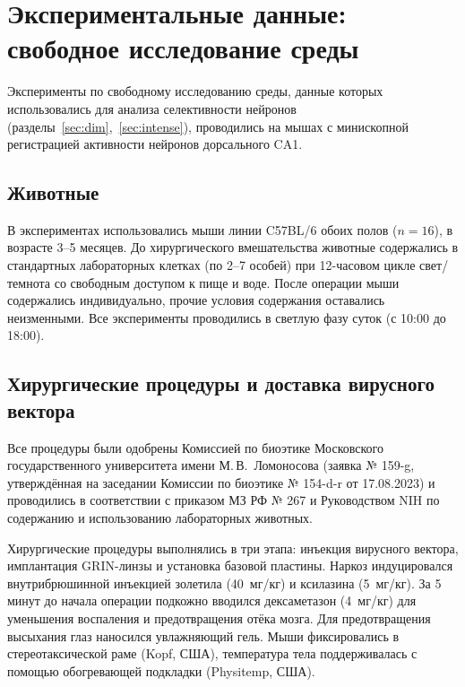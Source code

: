 
\section{Экспериментальные данные: свободное исследование среды}\label{sec:nof_data}

Эксперименты по свободному исследованию среды, данные которых использовались для анализа селективности нейронов (разделы~\ref{sec:dim},~\ref{sec:intense}), проводились на мышах с минископной регистрацией активности нейронов дорсального CA1.

\subsection{Животные}

В экспериментах использовались мыши линии C57BL/6 обоих полов ($n=16$), в возрасте 3--5 месяцев. До хирургического вмешательства животные содержались в стандартных лабораторных клетках (по 2--7 особей) при 12-часовом цикле свет/темнота со свободным доступом к пище и воде. После операции мыши содержались индивидуально, прочие условия содержания оставались неизменными. Все эксперименты проводились в светлую фазу суток (с 10:00 до 18:00).

\subsection{Хирургические процедуры и доставка вирусного вектора}

Все процедуры были одобрены Комиссией по биоэтике Московского государственного университета имени М.\,В.~Ломоносова (заявка № 159-g, утверждённая на заседании Комиссии по биоэтике № 154-d-r от 17.08.2023) и проводились в соответствии с приказом МЗ РФ № 267 и Руководством NIH по содержанию и использованию лабораторных животных.

Хирургические процедуры выполнялись в три этапа: инъекция вирусного вектора, имплантация GRIN-линзы и установка базовой пластины. Наркоз индуцировался внутрибрюшинной инъекцией золетила (40~мг/кг) и ксилазина (5~мг/кг). За 5 минут до начала операции подкожно вводился дексаметазон (4~мг/кг) для уменьшения воспаления и предотвращения отёка мозга. Для предотвращения высыхания глаз наносился увлажняющий гель. Мыши фиксировались в стереотаксической раме (Kopf, США), температура тела поддерживалась с помощью обогревающей подкладки (Physitemp, США).

